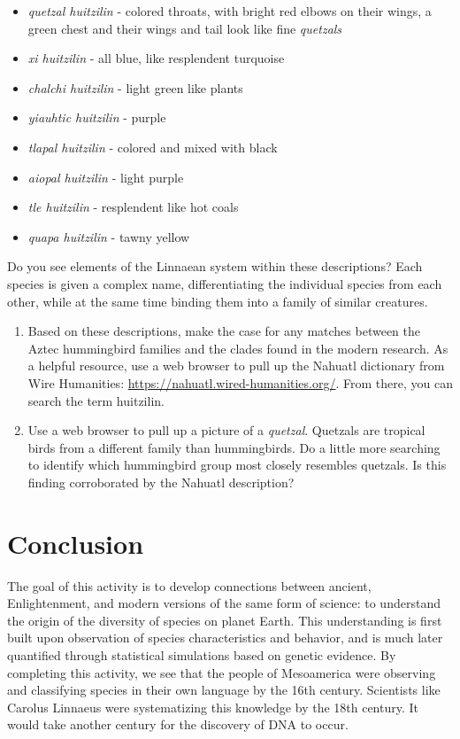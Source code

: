 \documentclass[12pt]{article}
\begin{document}
\begin{itemize}
\item \textit{quetzal huitzilin} - colored throats, with bright red elbows on their wings, a green chest and their wings and tail look like fine \textit{quetzals}
\item \textit{xi huitzilin} - all blue, like resplendent turquoise
\item \textit{chalchi huitzilin} - light green like plants
\item \textit{yiauhtic huitzilin} - purple
\item \textit{tlapal huitzilin} - colored and mixed with black
\item \textit{aiopal huitzilin} - light purple
\item \textit{tle huitzilin} - resplendent like hot coals
\item \textit{quapa huitzilin} - tawny yellow
\end{itemize}

Do you see elements of the Linnaean system within these descriptions?  Each species is given a complex name, differentiating the individual species from each other, while at the same time binding them into a family of similar creatures.

\begin{enumerate}
\item Based on these descriptions, make the case for any matches between the Aztec hummingbird families and the clades found in the modern research. As a helpful resource, use a web browser to pull up the Nahuatl dictionary from Wire Humanities: \url{https://nahuatl.wired-humanities.org/}.  From there, you can search the term huitzilin.  \\ \vspace{2.5cm}
\item Use a web browser to pull up a picture of a \textit{quetzal}.  Quetzals are tropical birds from a different family than hummingbirds.  Do a little more searching to identify which hummingbird group most closely resembles quetzals.  Is this finding corroborated by the Nahuatl description? \\ \vspace{2.5cm}
\end{enumerate}

\section{Conclusion}

The goal of this activity is to develop connections between ancient, Enlightenment, and modern versions of the same form of science: to understand the origin of the diversity of species on planet Earth.  This understanding is first built upon observation of species characteristics and behavior, and is much later quantified through statistical simulations based on genetic evidence.  By completing this activity, we see that the people of Mesoamerica were observing and classifying species in their own language by the 16th century.  Scientists like Carolus Linnaeus were systematizing this knowledge by the 18th century.  It would take another century for the discovery of DNA to occur.
\end{document}
